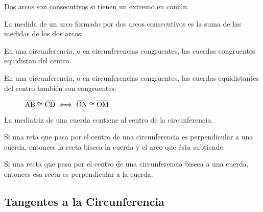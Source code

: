 \begin{definition}
    Dos arcos son consecutivos si tienen un extremo en común.
\end{definition}

\begin{postulate}
    La medida de un arco formado por dos arcos consecutivos es la suma de las medidas de los dos arcos.
\end{postulate}

\begin{theorem}
    En una circunferencia, o en circunferencias congruentes, las cuerdas congruentes equidistan del centro.
\end{theorem}

\clearpage

\begin{theorem}
    En una circunferencia, o en circunferencias congruentes, las cuerdas equidistantes del centro también son congruentes.
\end{theorem}


\begin{figure}[!h]
    \centering
    
    \caption{$\overline{\rm AB} \cong \overline{\rm CD} \iff \overline{\rm ON} \cong \overline{\rm OM}$}
    \label{fig:equidistant-to-center-cords-congruent}
\end{figure}

\begin{theorem}
    La mediatriz de una cuerda contiene al centro de la circunferencia.
\end{theorem}

\begin{theorem}
    Si una reta que pasa por el centro de una circunferencia es perpendicular a una cuerda, entonces la recta biseca la cuerda y el arco que ésta subtiende.
\end{theorem}

\begin{theorem}
    Si una recta que pasa por el centro de una circunferencia biseca a una cuerda, entonces esa recta es perpendicular a la cuerda.
\end{theorem}

\begin{figure}[!h]
    \centering
    
    \label{fig:circle-cord-bisector}
\end{figure}

\clearpage

\subsection{Tangentes a la Circunferencia}

